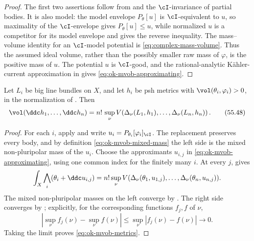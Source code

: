 \begin{proof}
The first two assertions follow from
 and the $\cI$-invariance of partial
bodies.  It is also model: the model envelope
$P_\theta[u]$ is $\cI$-equivalent to $u$, so maximality of the
$\cI$-envelope gives $P_\theta[u]\leq u$, while normalized $u$ is a
competitor for its model envelope and gives the reverse inequality.  The
mass--volume identity for an $\cI$-model potential is
\eqref{eq:complex-mass-volume}.  Thus the assumed ideal volume, rather than
the possibly smaller raw mass of $\varphi$, is the positive mass of
$u$.  The potential $u$ is $\cI$-good, and the rational-analytic
K\"ahler-current approximation in \cite[Theorem~7.1.1]{XiaBook} gives
\eqref{eq:ok-mvob-approximating}.
\end{proof}

\par\noindent\begin{minipage}{\linewidth}
\begin{theorem}\label{thm:ok-mvob-metrics}
Let $L_i$ be big line bundles on $X$, and let $h_i$ be psh metrics
with $\vol(\theta_i,\varphi_i)>0$, in the normalization of
.  Then
\[
 \vol(\ddc h_1,\dots,\ddc h_n)
 =n!\,\sup_\nu V\!\left(
    \Delta_\nu(L_1,h_1),\dots,\Delta_\nu(L_n,h_n)\right).
\tag{55.48}\label{eq:ok-mvob-metrics}
\]
\end{theorem}
\end{minipage}\par


\begin{proof}
For each $i$, apply  and write
$u_i=P_{\theta_i}[\varphi_i]_{\cI}$.  The replacement preserves every
body, and by definition \eqref{eq:ok-mvob-mixed-mass} the left side is the
mixed non-pluripolar mass of the $u_i$.  Choose the approximants
$u_{i,j}$ in \eqref{eq:ok-mvob-approximating}, using one common index for
the finitely many $i$.  At every $j$,
 gives
\[
 \int_X\bigwedge_i(\theta_i+\ddc u_{i,j})
 =n!\sup_\nu V(\Delta_\nu(\theta_1,u_{1,j}),\ldots,
                    \Delta_\nu(\theta_n,u_{n,j})).
\]
The mixed non-pluripolar masses on the left converge by
\cite[Theorem~6.2.1]{XiaBook}.  The right side converges by
; explicitly, for the corresponding functions
$f_j,f$ of $\nu$,
\[
 \left|\sup_\nu f_j(\nu)-\sup_\nu f(\nu)\right|
 \leq\sup_\nu|f_j(\nu)-f(\nu)|\longrightarrow0.
\]
Taking the limit proves \eqref{eq:ok-mvob-metrics}.
\end{proof}

